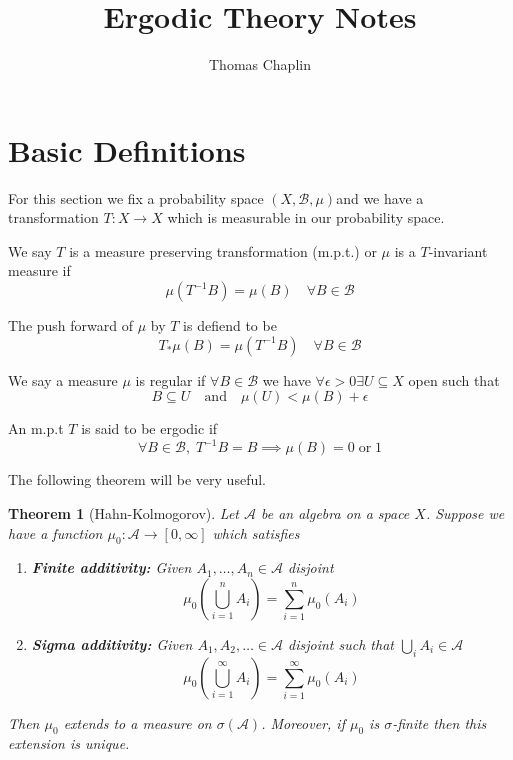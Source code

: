 \documentclass[11pt]{article}
\title{Ergodic Theory Notes}
\author{Thomas Chaplin}
\date{}
\newcommand{\msrspc}{\ensuremath{(X,\mathcal{B},\mu)}}
\newenvironment{defin}
	{\begin{mdframed}[backgroundcolor=white, roundcorner=5pt, linewidth=1pt, linecolor=RoyalBlue]}
	{\end{mdframed}}
\newcommand{\mdf}[1]{{\color{RoyalBlue} #1}}
\newtheorem{theorem}[prop]{Theorem}
\begin{document}
\maketitle
\tableofcontents
\newpage

\section{Basic Definitions}

For this section we fix a probability space \msrspc and we have a transformation $T:X\to X$ which is measurable in our probability space.

\begin{defin}
	
We say $T$ is a \mdf{measure preserving transformation (m.p.t.)} or $\mu$ is a \mdf{$T$-invariant measure} if 
$$\mu(T^{-1}B)=\mu(B)\quad\forall B\in\mathcal{B}$$

The \mdf{push forward of $\mu$ by $T$} is defiend to be
	$$T_*\mu(B)=\mu(T^{-1}B)\quad\forall B \in\mathcal{B}$$

We say a measure $\mu$ is \mdf{regular} if $\forall B\in\mathcal{B}$ we have $\forall\epsilon >0 \exists U\subseteq X$ open such that
$$B\subseteq U \quad \text{and} \quad \mu(U) < \mu(B) + \epsilon$$

An m.p.t $T$ is said to be \mdf{ergodic} if
$$\forall B\in\mathcal{B},\; T^{-1}B=B \implies \mu(B)=0\;\text{or}\;1$$

\end{defin}

The following theorem will be very useful.

\begin{theorem}[Hahn-Kolmogorov]
Let $\mathcal{A}$ be an algebra on a space $X$.
Suppose we have a function $\mu_0:\mathcal{A}\to [0, \infty]$ which satisfies
\begin{enumerate}[label=(\roman*)]
	\item \textbf{Finite additivity: }Given $A_1, \dots, A_n\in\mathcal{A}$ disjoint
		\[
			\mu_0\left( \bigcup_{i=1}^n A_i\right)=\sum_{i=1}^{n}\mu_0(A_i)
		\]
	\item \textbf{Sigma additivity: }Given $A_1, A_2, \dots \in \mathcal{A}$ disjoint such that $\bigcup_i A_i\in\mathcal{A}$
		\[
			\mu_0\left( \bigcup_{i=1}^\infty A_i \right) = \sum_{i=1}^{\infty}\mu_0(A_i)
		\]
\end{enumerate}
Then $\mu_0$ extends to a measure on $\sigma(\mathcal{A})$.
Moreover, if $\mu_0$ is $\sigma$-finite then this extension is unique.
\end{theorem}
\end{document}
